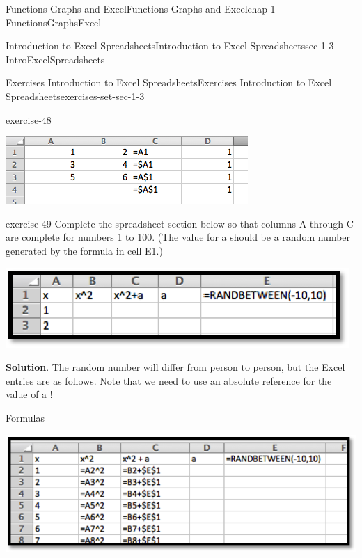 \documentclass[oneside,10pt,]{book}
\numberwithin{equation}{section}
\begin{document}
\begin{chapterptx}{Functions Graphs and Excel}{}{Functions Graphs and Excel}{}{}{chap-1-FunctionsGraphsExcel}
\begin{sectionptx}{Introduction to Excel Spreadsheets}{}{Introduction to Excel Spreadsheets}{}{}{sec-1-3-IntroExcelSpreadsheets}
\begin{exercises-subsection-numberless}{Exercises Introduction to Excel Spreadsheets}{}{Exercises Introduction to Excel Spreadsheets}{}{}{exercises-set-sec-1-3}
\begin{divisionexercise}{6}{}{}{exercise-48}
\begin{enumerate}[label=(\Alph*)]
\begin{sidebyside}{1}{0.1}{0.1}{0}
\begin{sbspanel}{0.8}
\includegraphics[width=1\linewidth]{images/sec1-3-e4.png}
\end{sbspanel}%
\end{sidebyside}%
%
\end{enumerate}
\end{divisionexercise}%
\begin{divisionexercise}{7}{}{}{exercise-49}%
\hypertarget{p-297}{}%
Complete the spreadsheet section below so that columns A through C are complete for numbers 1 to 100.  (The value for a should be a random number generated by the formula in cell E1.) \leavevmode%
\begin{sidebyside}{1}{0.2}{0.2}{0}%
\begin{sbspanel}{0.6}%
\includegraphics[width=1\linewidth]{images/sec1-3-e5.png}
\end{sbspanel}%
\end{sidebyside}%
%
\par\smallskip%
\noindent\textbf{Solution}.\hypertarget{solution-25}{}\quad%
\hypertarget{p-298}{}%
The random number will differ from person to person, but the Excel entries are as follows. Note that we need to use an absolute reference for the value of a !%
\par
\hypertarget{p-299}{}%
Formulas \leavevmode%
\begin{sidebyside}{1}{0.1}{0.1}{0}%
\begin{sbspanel}{0.8}%
\includegraphics[width=1\linewidth]{images/sec1-3-sol7a.png}

\end{sbspanel}
\end{sidebyside}
\end{divisionexercise}
\end{exercises-subsection-numberless}
\end{sectionptx}
\end{chapterptx}
\end{document}
